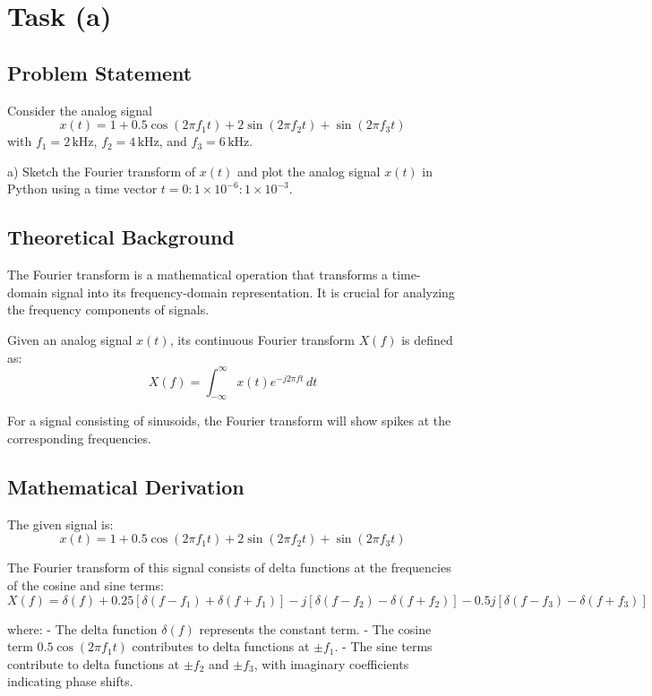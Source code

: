 \item[(a)]
\section*{Task (a)}

\subsection*{Problem Statement}
Consider the analog signal
\[ x(t) = 1 + 0.5 \cos \left(2 \pi f_{1} t \right) + 2 \sin \left(2 \pi f_{2} t \right) + \sin \left(2 \pi f_{3} t \right) \]
with \( f_{1} = 2 \, \text{kHz} \), \( f_{2} = 4 \, \text{kHz} \), and \( f_{3} = 6 \, \text{kHz} \).

a) Sketch the Fourier transform of \( x(t) \) and plot the analog signal \( x(t) \) in Python using a time vector \( t = 0:1 \times 10^{-6}:1 \times 10^{-3} \).

\subsection*{Theoretical Background}
The Fourier transform is a mathematical operation that transforms a time-domain signal into its frequency-domain representation. It is crucial for analyzing the frequency components of signals.

Given an analog signal \( x(t) \), its continuous Fourier transform \( X(f) \) is defined as:
\[ X(f) = \int_{-\infty}^{\infty} x(t) e^{-j 2 \pi f t} \, dt \]

For a signal consisting of sinusoids, the Fourier transform will show spikes at the corresponding frequencies.

\subsection*{Mathematical Derivation}
The given signal is:
\[ x(t) = 1 + 0.5 \cos \left(2 \pi f_{1} t \right) + 2 \sin \left(2 \pi f_{2} t \right) + \sin \left(2 \pi f_{3} t \right) \]

The Fourier transform of this signal consists of delta functions at the frequencies of the cosine and sine terms:
\[ X(f) = \delta(f) + 0.25 \left[ \delta(f - f_1) + \delta(f + f_1) \right] - j \left[ \delta(f - f_2) - \delta(f + f_2) \right] - 0.5 j \left[ \delta(f - f_3) - \delta(f + f_3) \right] \]

where:
- The delta function \( \delta(f) \) represents the constant term.
- The cosine term \( 0.5 \cos(2 \pi f_{1} t) \) contributes to delta functions at \( \pm f_1 \).
- The sine terms contribute to delta functions at \( \pm f_2 \) and \( \pm f_3 \), with imaginary coefficients indicating phase shifts.

